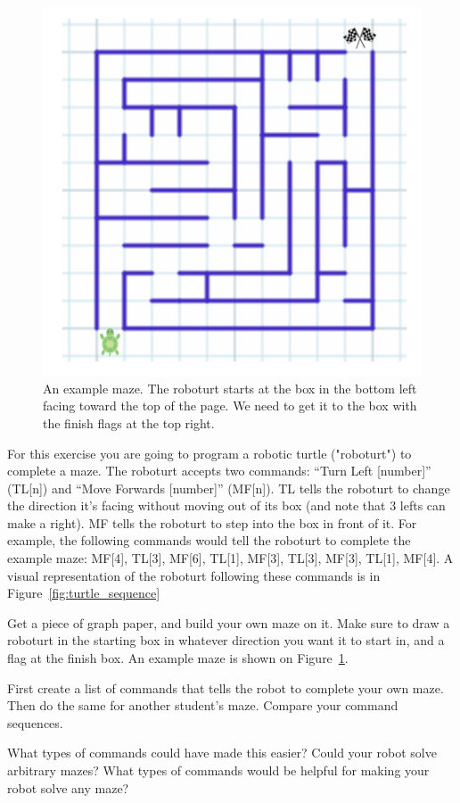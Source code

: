 \exercisesection

\begin{figure}
  \centering
    \includegraphics[width=.32\textwidth]{images/maze_example}
    \caption{An example maze. The roboturt starts at the box in the bottom left facing toward the top of the page. We need to get it to the box with the finish flags at the top right.}
    \label{fig:graph-paper}
\end{figure}

\begin{exercise}

For this exercise you are going to program a robotic turtle ("roboturt") to complete a maze. The roboturt accepts two commands:  ``Turn Left [number]'' (TL[n]) and ``Move Forwards [number]'' (MF[n]). TL tells the roboturt to change the direction it's facing without moving out of its box (and note that 3 lefts can make a right). MF tells the roboturt to step into the box in front of it. For example, the following commands would tell the roboturt to complete the example maze: MF[4], TL[3], MF[6], TL[1], MF[3], TL[3], MF[3], TL[1], MF[4]. A visual representation of the roboturt following these commands is in Figure~\ref{fig:turtle_sequence}

  Get a piece of graph paper, and build your own maze on it. Make sure to draw a roboturt in the starting box in whatever direction you want it to start in, and a flag at the finish box. An example maze is shown on Figure~\ref{fig:graph-paper}. 
  
First create a list of commands that tells the robot to complete your own maze. Then do the same for another student's maze. Compare your command sequences. 

  What types of commands could have made this easier? Could your robot solve
  arbitrary mazes? What types of commands would be helpful for making your robot
  solve any maze?
\end{exercise}

